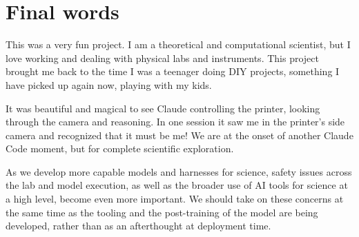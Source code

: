 \documentclass[11pt,letterpaper]{article}
\begin{document}
\section{Final words}

This was a very fun project. I am a theoretical and computational scientist, but I love working
and dealing with physical labs and instruments. This project brought me back to the time I was a
teenager doing DIY projects, something I have picked up again now, playing with my kids.

It was beautiful and magical to see Claude controlling the printer, looking through the camera and
reasoning. In one session it saw me in the printer's side camera and recognized that it must be
me! We are at the onset of another Claude Code moment, but for complete scientific
exploration.

As we develop more capable models and harnesses for science, safety issues across the lab and
model execution, as well as the broader use of AI tools for science at a high level, become even
more important. We should take on these concerns at the same time as the tooling and the
post-training of the model are being developed, rather than as an afterthought at deployment time.
\end{document}
